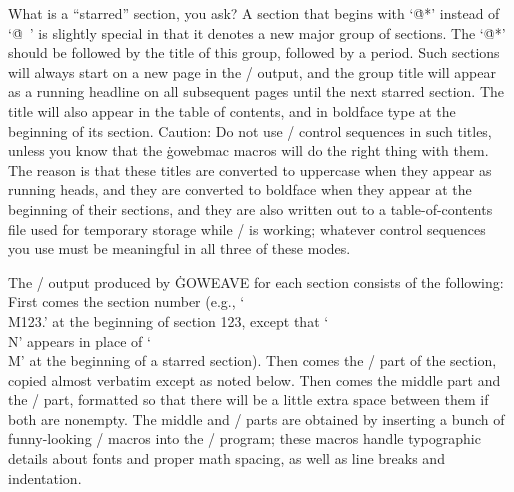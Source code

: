 What is a ``starred'' section, you ask? A section that begins with `\.{@*}'
instead of `\.{@\ }' is slightly special in that it denotes a new major
group of sections. The `\.{@*}' should be followed by the title of this
group, followed by a period. Such sections will always start on a new page
in the \TEX/ output, and the group title will appear as a running headline
on all subsequent pages until the next starred section. The title will also
appear in the table of contents, and in boldface type at the beginning of
its section. Caution:  Do not use \TEX/ control sequences in such titles,
unless you know that the \.{gowebmac} macros will do the right thing with
them. The reason is that these titles are converted to uppercase when
they appear as running heads, and they are converted to boldface when they
appear at the beginning of their sections, and they are also written out to
a table-of-contents file used for temporary storage while \TEX/ is
working; whatever control sequences you use must be meaningful in all
three of these modes.

The \TEX/ output produced by \.{GOWEAVE} for each section consists of
the following: First comes the section number (e.g., `\.{\\M123.}'
at the beginning of section 123, except that `\.{\\N}' appears in place of
`\.{\\M}' at the beginning of a starred section). Then comes the
\TEX/ part of the section, copied almost verbatim except as noted
below. Then comes the middle part and the \GO/ part, formatted
so that there will be a little extra space between them if both are
nonempty. The middle and \GO/ parts are obtained by inserting
a bunch of funny-looking \TEX/ macros into the \GO/ program; these
macros handle typographic details about fonts and proper math spacing,
as well as line breaks and indentation.

